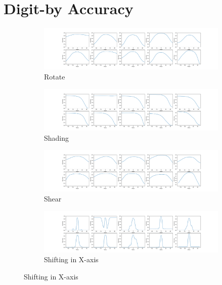 \section{Digit-by Accuracy}
\begin{figure}[htb!]
    \centering
    \begin{subfigure}[b]{\textwidth}
        \centering
        \includegraphics[width=\textwidth]{chapters/results/CNN/Rotate/accAll.png}
        \caption{Rotate}
        \label{fig:Rotate-misclass0}
    \end{subfigure}
    \begin{subfigure}[b]{\textwidth}
        \centering
        \includegraphics[width=\textwidth]{chapters/results/CNN/Shade/accAll.png}
        \caption{Shading}
        \label{fig:Rotate-misclass1}
    \end{subfigure}
    \begin{subfigure}[b]{\textwidth}
        \centering
        \includegraphics[width=\textwidth]{chapters/results/CNN/Shear/accAll.png}
        \caption{Shear}
        \label{fig:Rotate-misclass0}
    \end{subfigure}
    \begin{subfigure}[b]{\textwidth}
        \centering
        \includegraphics[width=\textwidth]{chapters/results/CNN/ShiftX/accAll.png}
        \caption{Shifting in X-axis}
        \label{fig:Rotate-misclass0}
    \end{subfigure}
    \label{fig:Rotate-misclassifications}
\end{figure}

